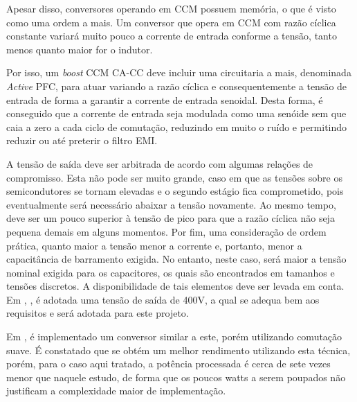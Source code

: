 \documentclass[
        12pt,
        openany, %
        oneside, %
        a4paper,			
        english,			
        brazil
        ]{abntbibufjf}
\begin{document}
Apesar disso, conversores operando em CCM possuem memória, o que é visto como uma ordem a mais. Um conversor que opera em CCM com razão cíclica constante variará muito pouco a corrente de entrada conforme a tensão, tanto menos quanto maior for o indutor.




Por isso, um \textit{boost} CCM CA-CC deve incluir uma circuitaria a mais, denominada \textit{Active} PFC, para atuar variando a razão cíclica e consequentemente a tensão de entrada de forma a garantir a corrente de entrada senoidal. Desta forma, é conseguido que a corrente de entrada seja modulada como uma senóide sem que caia a zero a cada ciclo de comutação, reduzindo em muito o ruído e permitindo reduzir ou até preterir o filtro EMI.


A tensão de saída deve ser arbitrada de acordo com algumas relações de compromisso. Esta não pode ser muito grande, caso em que as tensões sobre os semicondutores se tornam elevadas e o segundo estágio fica comprometido, pois eventualmente será necessário abaixar a tensão novamente. Ao mesmo tempo, deve ser um pouco superior à tensão de pico para que a razão cíclica não seja pequena demais em alguns momentos. Por fim, uma consideração de ordem prática, quanto maior a tensão menor a corrente e, portanto, menor a capacitância de barramento exigida. No entanto, neste caso, será maior a tensão nominal exigida para os capacitores, os quais são encontrados em tamanhos e tensões discretos. A disponibilidade de tais elementos deve ser levada em conta. Em \cite{slua}, \cite{braga}, é adotada uma tensão de saída de 400V, a qual se adequa bem aos requisitos e será adotada para este projeto.

Em \cite{braga}, é implementado um conversor similar a este, porém utilizando comutação suave. É constatado que se obtém um melhor rendimento utilizando esta técnica, porém, para o caso aqui tratado, a potência processada é cerca de sete vezes menor que naquele estudo, de forma que os poucos watts a serem poupados não justificam a complexidade maior de implementação.


\end{document}
